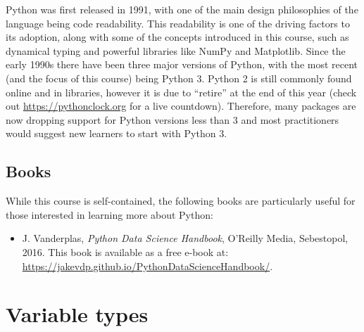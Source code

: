 \documentclass[a4paper]{article}
\begin{document}
Python was first released in 1991, with one of the main design philosophies of the language being code readability. 
This readability is one of the driving factors to its adoption, along with some of the concepts introduced in this course, such as dynamical typing and powerful libraries like NumPy and Matplotlib. 
Since the early 1990s there have been three major versions of Python, with the most recent (and the focus of this course) being Python 3. 
Python 2 is still commonly found online and in libraries, however it is due to ``retire'' at the end of this year (check out \url{https://pythonclock.org} for a live countdown). 
Therefore, many packages are now dropping support for Python versions less than 3 and most practitioners would suggest new learners to start with Python 3. 

\subsection{Books}

While this course is self-contained, the following books are particularly useful for those interested in learning more about Python: 
\begin{itemize}
	\item J. Vanderplas, \emph{Python Data Science Handbook}, O'Reilly Media, Sebestopol, 2016. This book is available as a free e-book at: \url{https://jakevdp.github.io/PythonDataScienceHandbook/}.
\end{itemize}

\section{Variable types}



\end{document}
